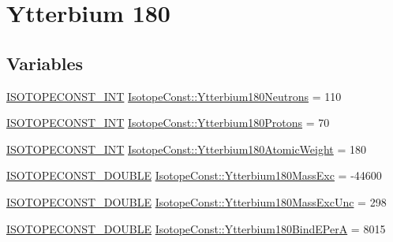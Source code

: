 \hypertarget{group___isotope_const-_ytterbium-_yb180}{}\section{Ytterbium 180}
\label{group___isotope_const-_ytterbium-_yb180}
\subsection*{Variables}
\begin{DoxyCompactItemize}
\item 
\mbox{\hyperlink{group___isotope_const-_macros_ga5f18360b3e99483a35c32d789e62621c}{I\+S\+O\+T\+O\+P\+E\+C\+O\+N\+S\+T\+\_\+\+I\+NT}} \mbox{\hyperlink{group___isotope_const-_ytterbium-_yb180_gab6ebe37a128643b29631e97cea638ff4}{Isotope\+Const\+::\+Ytterbium180\+Neutrons}} = 110
\item 
\mbox{\hyperlink{group___isotope_const-_macros_ga5f18360b3e99483a35c32d789e62621c}{I\+S\+O\+T\+O\+P\+E\+C\+O\+N\+S\+T\+\_\+\+I\+NT}} \mbox{\hyperlink{group___isotope_const-_ytterbium-_yb180_ga454234bf7e83444077a1c955fd737648}{Isotope\+Const\+::\+Ytterbium180\+Protons}} = 70
\item 
\mbox{\hyperlink{group___isotope_const-_macros_ga5f18360b3e99483a35c32d789e62621c}{I\+S\+O\+T\+O\+P\+E\+C\+O\+N\+S\+T\+\_\+\+I\+NT}} \mbox{\hyperlink{group___isotope_const-_ytterbium-_yb180_ga90bf891517d049ce29a5c6e43bfc0b9c}{Isotope\+Const\+::\+Ytterbium180\+Atomic\+Weight}} = 180
\item 
\mbox{\hyperlink{group___isotope_const-_macros_ga8f45a7272ce02c0b4c65c44636ed719a}{I\+S\+O\+T\+O\+P\+E\+C\+O\+N\+S\+T\+\_\+\+D\+O\+U\+B\+LE}} \mbox{\hyperlink{group___isotope_const-_ytterbium-_yb180_ga0571af7e14078b0df2eba842ca11c7f9}{Isotope\+Const\+::\+Ytterbium180\+Mass\+Exc}} = -\/44600
\item 
\mbox{\hyperlink{group___isotope_const-_macros_ga8f45a7272ce02c0b4c65c44636ed719a}{I\+S\+O\+T\+O\+P\+E\+C\+O\+N\+S\+T\+\_\+\+D\+O\+U\+B\+LE}} \mbox{\hyperlink{group___isotope_const-_ytterbium-_yb180_gaf01853e05135e016601fa16a115063a9}{Isotope\+Const\+::\+Ytterbium180\+Mass\+Exc\+Unc}} = 298
\item 
\mbox{\hyperlink{group___isotope_const-_macros_ga8f45a7272ce02c0b4c65c44636ed719a}{I\+S\+O\+T\+O\+P\+E\+C\+O\+N\+S\+T\+\_\+\+D\+O\+U\+B\+LE}} \mbox{\hyperlink{group___isotope_const-_ytterbium-_yb180_ga88805bdc49070ba7701f6b27fa469814}{Isotope\+Const\+::\+Ytterbium180\+Bind\+E\+PerA}} = 8015
\item 

\end{DoxyCompactItemize}
